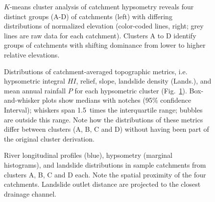 \documentclass[draft]{agujournal2019}
\begin{document}
\begin{figure}[ht!]
  \begin{minipage}{.66\linewidth}
    \centering
  \end{minipage}\quad
  \begin{minipage}{.24\linewidth}
    \centering
  \end{minipage}
    \caption{$K$-means cluster analysis of catchment hypsometry reveals four distinct groups (A-D) of catchments (left) with differing distributions of normalized elevation (color-coded lines, right; grey lines are raw data for each catchment). Clusters A to D identify groups of catchments with shifting dominance from lower to higher relative elevations.}
    \label{fig:knickpoints}
\end{figure}

\begin{figure}[ht!]
    \caption{Distributions of catchment-averaged topographic metrics, i.e. hypsometric integral $HI$, relief, slope, landslide density (Lands.), and mean annual rainfall $P$ for each hypsometric cluster (Fig.~\ref{fig:knickpoints}). Box-and-whisker plots show medians with notches (95\% confidence Interval); whiskers span 1.5~times the interquartile range; bubbles are outside this range. Note how the distributions of these metrics differ between clusters (A, B, C and D) without having been part of the original cluster derivation.}
  \label{fig:cluster2}
\end{figure}

\begin{figure}[ht!]
  \begin{minipage}{.48\linewidth}
    \centering
  \end{minipage}\quad
  \begin{minipage}{.48\linewidth}
    \centering
  \end{minipage}
    \caption{River longitudinal profiles (blue), hypsometry (marginal histograms), and landslide distributions in sample catchments from clusters A, B, C and D each. Note the spatial proximity of the four catchments. Landslide outlet distance are projected to the closest drainage channel.}
    \label{fig:cluster-profile}
\end{figure}
\end{document}
